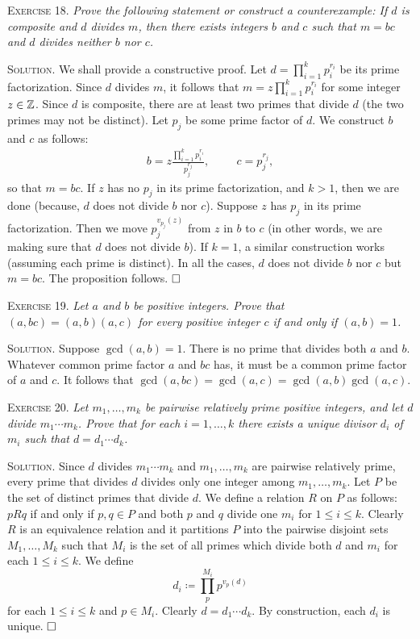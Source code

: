 \documentclass[11pt, leqno]{article}
\newcommand{\done}{\ensuremath{\hfill\square}}
\begin{document}
\textsc{Exercise 18}. \emph{Prove the following statement or construct a counterexample: If $d$ is composite and $d$ divides $m$, then there exists integers $b$ and $c$ such that $m=bc$ and $d$ divides neither $b$ nor $c$.}

\textsc{Solution}. We shall provide a constructive proof. Let $d = \prod_{i=1}^k p_i^{r_i}$ be its prime factorization. Since $d$ divides $m$, it follows that $m = z \prod_{i=1}^k p_i^{r_i}$ for some integer $z\in \mathbb{Z}$. Since $d$ is composite, there are at least two primes that divide $d$ (the two primes may not be distinct). Let $p_j$ be some prime factor of $d$. We construct $b$ and $c$ as follows: 
\begin{align*}
b = z \frac{\prod_{i=1}^k p_i^{r_i}}{ p_j^{r_j}}, \hspace{1cm} c = p_j^{r_j},
\end{align*}
so that $m = bc$. If $z$ has no $p_j$ in its prime factorization, and $k>1$, then we are done (because, $d$ does not divide $b$ nor $c$). Suppose $z$ has $p_j$ in its prime factorization. Then we move $p_j^{v_{p_j}(z)}$ from $z$ in $b$ to $c$ (in other words, we are making sure that $d$ does not divide $b$). If $k=1$, a similar construction works (assuming each prime is distinct). In all the cases, $d$ does not divide $b$ nor $c$ but $m = bc$. The proposition follows. \done

\textsc{Exercise 19}. \emph{Let $a$ and $b$ be positive integers. Prove that $(a,bc) = (a,b)(a,c)$ for every positive integer $c$ if and only if $(a,b)=1$.}

\textsc{Solution}. Suppose $\gcd(a,b) = 1$. There is no prime that divides both $a$ and $b$. Whatever common prime factor $a$ and $bc$ has, it must be a common prime factor of $a$ and $c$. It follows that $\gcd(a, bc) = \gcd(a, c) = \gcd(a,b) \gcd(a, c)$.

\textsc{Exercise 20}. \emph{Let $m_1, \ldots, m_k$ be pairwise relatively prime positive integers, and let $d$ divide $m_1\cdots m_k$. Prove that for each $i = 1, \ldots, k$ there exists a unique divisor $d_i$ of $m_i$ such that $d= d_1\cdots d_k$.}

\textsc{Solution}. Since $d$ divides $m_1\cdots m_k$ and $m_1, \ldots, m_k$ are pairwise relatively prime, every prime that divides $d$ divides only one integer among $m_1, \ldots, m_k$. Let $P$ be the set of distinct primes that divide $d$. We define a relation $R$ on $P$ as follows: $pRq$ if and only if $p,q\in P$ and both $p$ and $q$ divide one $m_i$ for $1\leq i \leq k$. Clearly $R$ is an equivalence relation and it partitions $P$ into the pairwise disjoint sets $M_1, \ldots, M_k$ such that $M_i$ is the set of all primes which divide both $d$ and $m_i$ for each $1 \leq i \leq k$. We define 
\begin{displaymath}
d_i \coloneqq \prod_p^{M_i} p^{v_p(d)}
\end{displaymath}
for each $1 \leq i \leq k$ and $p\in M_i$. Clearly $d = d_1\cdots d_k$. By construction, each $d_i$ is unique. \done
\end{document}
